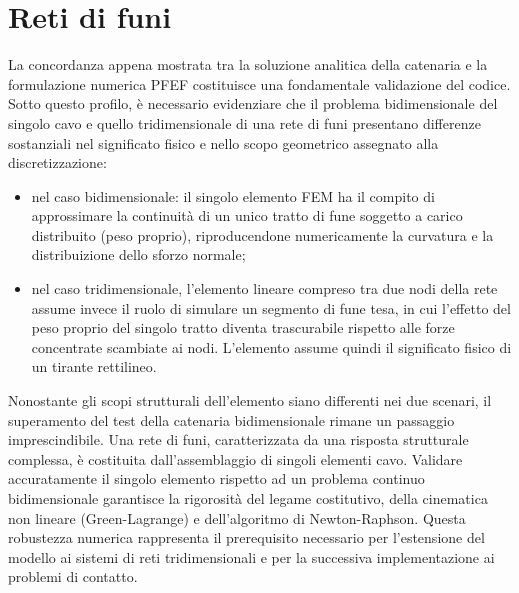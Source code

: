 \section{Reti di funi}\label{chap:reti_di_funi}
La concordanza appena mostrata tra la soluzione analitica della catenaria e la formulazione numerica PFEF costituisce una fondamentale validazione del codice. Sotto questo profilo, è necessario evidenziare che il problema bidimensionale del singolo cavo e quello tridimensionale di una rete di funi presentano differenze sostanziali nel significato fisico e nello scopo geometrico assegnato alla discretizzazione: 
\begin{itemize}
   \item nel caso bidimensionale: il singolo elemento FEM ha il compito di approssimare la continuità di un unico tratto di fune soggetto a carico distribuito (peso proprio), riproducendone numericamente la curvatura e la distribuizione dello sforzo normale;
   \item nel caso tridimensionale, l'elemento lineare compreso tra due nodi della rete assume invece il ruolo di simulare un segmento di fune tesa, in cui l'effetto del peso proprio del singolo tratto diventa trascurabile rispetto alle forze concentrate scambiate ai nodi. L'elemento assume quindi il significato fisico di un tirante rettilineo. 
\end{itemize}

Nonostante gli scopi strutturali dell'elemento siano differenti nei due scenari, il superamento del test della catenaria bidimensionale rimane un passaggio imprescindibile. Una rete di funi, caratterizzata da una risposta strutturale complessa, è costituita dall'assemblaggio di singoli elementi cavo. Validare accuratamente il singolo elemento rispetto ad un problema continuo bidimensionale garantisce la rigorosità del legame costitutivo, della cinematica non lineare (Green-Lagrange) e dell'algoritmo di Newton-Raphson. Questa robustezza numerica rappresenta il prerequisito necessario per l'estensione del modello ai sistemi di reti tridimensionali e per la successiva implementazione ai problemi di contatto. 

